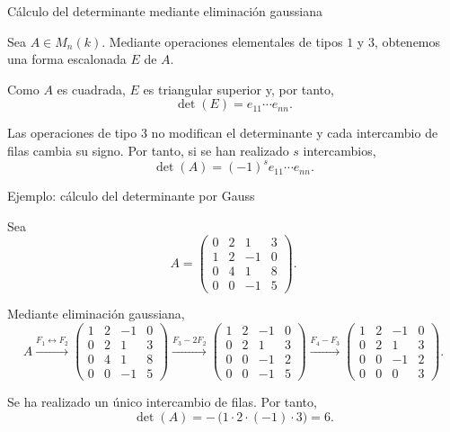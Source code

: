 \begin{frame}{Cálculo del determinante mediante eliminación gaussiana}

Sea \(A\in M_n(k)\). Mediante operaciones elementales de tipos \(1\)
y \(3\), obtenemos una forma escalonada \(E\) de \(A\).

Como \(A\) es cuadrada, \(E\) es triangular superior y, por tanto,
\[
\det(E)=e_{11}\cdots e_{nn}.
\]

Las operaciones de tipo \(3\) no modifican el determinante y cada
intercambio de filas cambia su signo. Por tanto, si se han realizado
\(s\) intercambios,
\[
\det(A)=(-1)^s e_{11}\cdots e_{nn}.
\]

\end{frame}

\begin{frame}{Ejemplo: cálculo del determinante por Gauss}

Sea
\[
A=
\begin{pmatrix}
0&2&1&3\\
1&2&-1&0\\
0&4&1&8\\
0&0&-1&5
\end{pmatrix}.
\]

Mediante eliminación gaussiana,
\[
A
\xrightarrow{F_1\leftrightarrow F_2}
\begin{pmatrix}
1&2&-1&0\\
0&2&1&3\\
0&4&1&8\\
0&0&-1&5
\end{pmatrix}
\xrightarrow{F_3-2F_2}
\begin{pmatrix}
1&2&-1&0\\
0&2&1&3\\
0&0&-1&2\\
0&0&-1&5
\end{pmatrix}
\xrightarrow{F_4-F_3}
\begin{pmatrix}
1&2&-1&0\\
0&2&1&3\\
0&0&-1&2\\
0&0&0&3
\end{pmatrix}.
\]

Se ha realizado un único intercambio de filas. Por tanto,
\[
\det(A)
=
-\,\bigl(1\cdot2\cdot(-1)\cdot3\bigr)
=
6.
\]

\end{frame}

